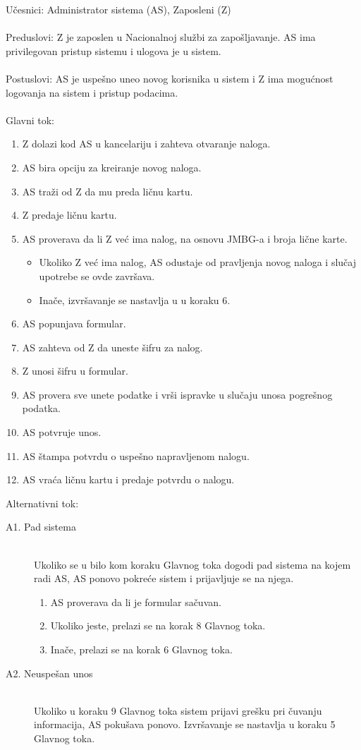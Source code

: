 \noindent U\v cesnici: Administrator sistema (AS), Zaposleni (Z)
\\
\\ Preduslovi: Z je zaposlen u Nacionalnoj slu\v zbi za zapo\v sljavanje. AS ima privilegovan pristup sistemu i ulogova je u sistem.
\\
\\ Postuslovi: AS je uspe\v sno uneo novog korisnika u sistem i Z ima mogu\' cnost logovanja na sistem i pristup podacima.
\\
\\ Glavni tok:
\begin{enumerate}
	\item Z dolazi kod AS u kancelariju i zahteva otvaranje naloga.
	\item AS bira opciju za kreiranje novog naloga.
	\item AS tra\v zi od Z da mu preda li\v cnu kartu.
	\item Z predaje li\v cnu kartu.
	\item AS proverava da li Z ve\' c ima nalog, na osnovu JMBG-a i broja li\v cne karte.
	\begin{itemize}
		\item Ukoliko Z ve\' c ima nalog, AS odustaje od pravljenja novog naloga i slu\v caj upotrebe se ovde zavr\v sava.
		\item Ina\v ce, izvr\v savanje se nastavlja u u koraku 6.
	\end{itemize}
	\item AS popunjava formular.
	\item AS zahteva od Z da uneste \v sifru za nalog.
	\item Z unosi \v sifru u formular.
	\item AS provera sve unete podatke i vr\v si ispravke u slu\v caju unosa pogre\v snog podatka.
	\item AS potvr\dj uje unos.
	\item AS \v stampa potvrdu o uspe\v sno napravljenom nalogu.
	\item AS vra\' ca li\v cnu kartu i predaje potvrdu o nalogu. 
	
\end{enumerate}

\noindent Alternativni tok:
\begin{description}
	\item[A1. Pad sistema] ~\\
	Ukoliko se u bilo kom koraku Glavnog toka dogodi pad sistema na kojem radi AS, AS ponovo pokre\'ce sistem i prijavljuje se na njega.
	\begin{enumerate}
		\item AS proverava da li je formular sa\v cuvan.
		\item Ukoliko jeste, prelazi se na korak 8 Glavnog toka.
		\item Ina\v ce, prelazi se na korak 6 Glavnog toka.
	\end{enumerate}
	\item[A2. Neuspe\v san unos] ~\\
	Ukoliko u koraku 9 Glavnog toka sistem prijavi gre\v sku pri \v cuvanju informacija, AS poku\v sava ponovo. Izvr\v savanje se nastavlja u koraku 5 Glavnog toka.
\end{description}


